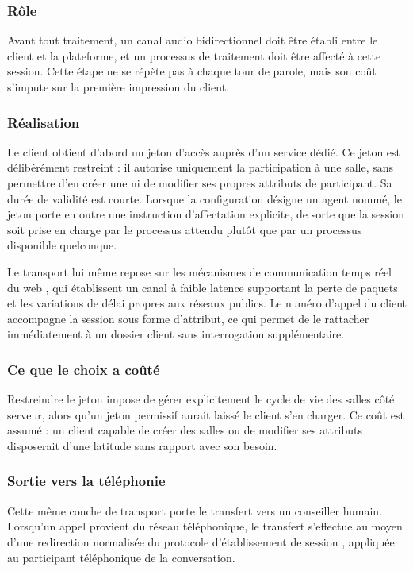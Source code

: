\subsubsection{Rôle}

Avant tout traitement, un canal audio bidirectionnel doit être établi entre le client et la plateforme, et un processus de traitement doit être affecté à cette session. Cette étape ne se répète pas à chaque tour de parole, mais son coût s'impute sur la première impression du client.

\subsubsection{Réalisation}

Le client obtient d'abord un jeton d'accès auprès d'un service dédié. Ce jeton est délibérément restreint : il autorise uniquement la participation à une salle, sans permettre d'en créer une ni de modifier ses propres attributs de participant. Sa durée de validité est courte. Lorsque la configuration désigne un agent nommé, le jeton porte en outre une instruction d'affectation explicite, de sorte que la session soit prise en charge par le processus attendu plutôt que par un processus disponible quelconque.

Le transport lui même repose sur les mécanismes de communication temps réel du web \cite{webrtc}, qui établissent un canal à faible latence supportant la perte de paquets et les variations de délai propres aux réseaux publics. Le numéro d'appel du client accompagne la session sous forme d'attribut, ce qui permet de le rattacher immédiatement à un dossier client sans interrogation supplémentaire.

\subsubsection{Ce que le choix a coûté}

Restreindre le jeton impose de gérer explicitement le cycle de vie des salles côté serveur, alors qu'un jeton permissif aurait laissé le client s'en charger. Ce coût est assumé : un client capable de créer des salles ou de modifier ses attributs disposerait d'une latitude sans rapport avec son besoin.

\subsubsection{Sortie vers la téléphonie}

Cette même couche de transport porte le transfert vers un conseiller humain. Lorsqu'un appel provient du réseau téléphonique, le transfert s'effectue au moyen d'une redirection normalisée du protocole d'établissement de session \cite{sip}, appliquée au participant téléphonique de la conversation.

